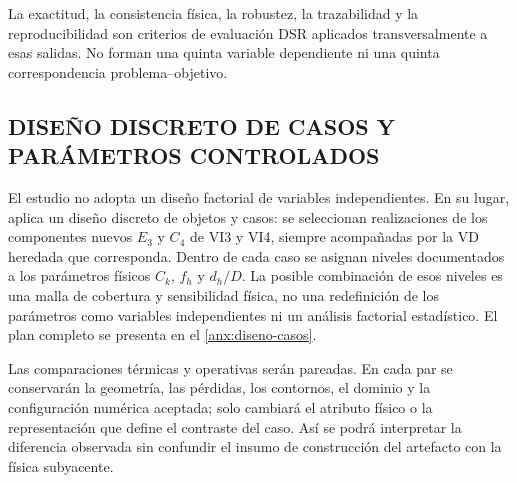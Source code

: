 \documentclass[11pt,a4paper,oneside]{report}
\begin{document}
La exactitud, la consistencia física, la robustez, la trazabilidad y la reproducibilidad son criterios de evaluación DSR aplicados transversalmente a esas salidas. No forman una quinta variable dependiente ni una quinta correspondencia problema--objetivo.

\subsection{DISEÑO DISCRETO DE CASOS Y PARÁMETROS CONTROLADOS}

El estudio no adopta un diseño factorial de variables independientes. En su lugar, aplica un diseño discreto de objetos y casos: se seleccionan realizaciones de los componentes nuevos $E_3$ y $C_4$ de VI3 y VI4, siempre acompañadas por la VD heredada que corresponda. Dentro de cada caso se asignan niveles documentados a los parámetros físicos $C_k$, $f_h$ y $d_h/D$. La posible combinación de esos niveles es una malla de cobertura y sensibilidad física, no una redefinición de los parámetros como variables independientes ni un análisis factorial estadístico. El plan completo se presenta en el \ref{anx:diseno-casos}.

Las comparaciones térmicas y operativas serán pareadas. En cada par se conservarán la geometría, las pérdidas, los contornos, el dominio y la configuración numérica aceptada; solo cambiará el atributo físico o la representación que define el contraste del caso. Así se podrá interpretar la diferencia observada sin confundir el insumo de construcción del artefacto con la física subyacente.
\end{document}
